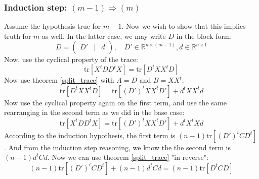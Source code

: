 \documentclass[12pt, a4paper]{article}
\numberwithin{equation}{section}
\begin{document}
\subsubsection{Induction step: $(m-1)\Rightarrow(m)$}
Assume the hypothesis true for $m-1$. Now we wish to show that this implies truth for $m$ as well. In the latter case, we may write $D$ in the block form:
\begin{equation}
D=\begin{pmatrix}
D' & | & d
\end{pmatrix},\quad
D'\in\mathbb{R}^{n\times(m-1)}, d\in\mathbb{R}^{n\times 1}
\end{equation}
Now, use the cyclical property of the trace:
\begin{equation}
\textrm{tr}[X^t DD^t X]=\textrm{tr}[D^t XX^t D]
\end{equation}
Now use theorem \ref{split_trace} with $A=D$ and $B=XX^t$:
\begin{equation}
\textrm{tr}[D^t XX^t D]=\textrm{tr}[(D')^t XX^t D']+d^t XX^t d
\end{equation}
Now use the cyclical property again on the first term, and use the same rearranging in the second term as we did in the base case:
\begin{equation}
\textrm{tr}[X^t DD^t X]=\textrm{tr}[(D')^t XX^t D']+d^t X^t Xd
\end{equation}
According to the induction hypothesis, the first term is $(n-1)\textrm{tr}[(D')^t CD^t]$. And from the induction step reasoning, we know the the second term is $(n-1)d^t Cd$. Now we can use theorem \ref{split_trace} "in reverse":
\begin{equation}
(n-1)\textrm{tr}[(D')^t CD^t]+(n-1)d^t Cd=(n-1)\textrm{tr}[D^t CD]
\end{equation}
\end{document}
